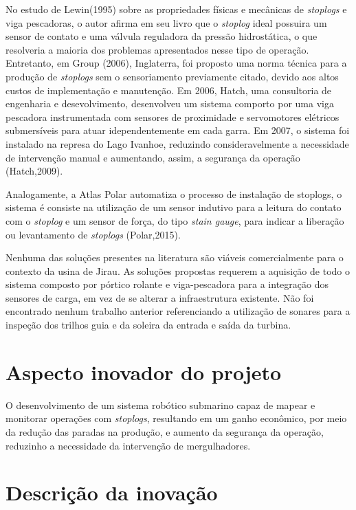 No estudo de Lewin(1995) sobre as propriedades físicas e mecânicas de 
\textit{stoplogs} e viga pescadoras, o autor afirma em seu livro que o
\textit{stoplog} ideal possuira um sensor de contato e uma válvula reguladora da
pressão hidrostática, o que resolveria a maioria dos problemas apresentados
nesse tipo de operação. Entretanto, em Group (2006), Inglaterra, foi proposto
uma norma técnica para a produção de \textit{stoplogs} sem o sensoriamento
previamente citado, devido aos altos custos de implementação e manutenção. Em
2006, Hatch, uma consultoria de engenharia e desevolvimento, desenvolveu um
sistema comporto por uma viga pescadora instrumentada com sensores de
proximidade e servomotores elétricos submersíveis para atuar idependentemente em
cada garra. Em 2007, o sistema foi instalado na represa do Lago Ivanhoe,
reduzindo consideravelmente a necessidade de intervenção manual e aumentando,
assim, a segurança da operação (Hatch,2009).

Analogamente, a Atlas Polar automatiza o processo de instalação de
stoplogs, o sistema é consiste na utilização de um sensor indutivo para a
leitura do contato com o \textit{stoplog} e um sensor de força, do tipo
\textit{stain gauge}, para indicar a liberação ou levantamento de
\textit{stoplogs} (Polar,2015).

Nenhuma das soluções presentes na literatura são viáveis comercialmente para o
contexto da usina de Jirau. As soluções propostas requerem a aquisição de todo o
sistema composto por pórtico rolante e viga-pescadora para a integração dos
sensores de carga, em vez de se alterar a infraestrutura existente. Não foi
encontrado nenhum trabalho anterior referenciando a utilização de sonares para a
inspeção dos trilhos guia e da soleira da entrada e saída da turbina.

\chapter{Aspecto inovador do projeto}

O desenvolvimento de um sistema robótico submarino capaz de mapear e monitorar
operações com \textit{stoplogs}, resultando em um ganho econômico, por meio da
redução das paradas na produção, e aumento da segurança da operação,
reduzinho a necessidade da intervenção de mergulhadores.

\chapter{Descrição da inovação}

